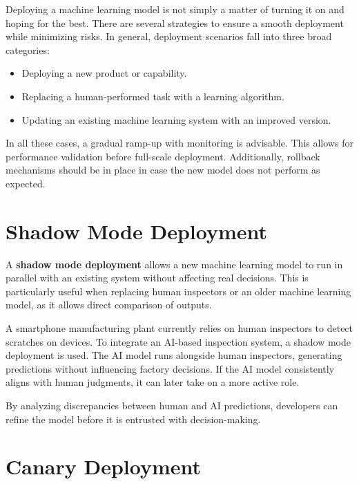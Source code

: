 \documentclass[12pt,openany]{book}
\begin{document}
Deploying a machine learning model is not simply a matter of turning it on and hoping for the best. There are several strategies to ensure a smooth deployment while minimizing risks. In general, deployment scenarios fall into three broad categories:

\begin{itemize}
    \item Deploying a new product or capability.
    \item Replacing a human-performed task with a learning algorithm.
    \item Updating an existing machine learning system with an improved version.
\end{itemize}

In all these cases, a gradual ramp-up with monitoring is advisable. This allows for performance validation before full-scale deployment. Additionally, rollback mechanisms should be in place in case the new model does not perform as expected.



\section{Shadow Mode Deployment}

A \textbf{shadow mode deployment} allows a new machine learning model to run in parallel with an existing system without affecting real decisions. This is particularly useful when replacing human inspectors or an older machine learning model, as it allows direct comparison of outputs.

\begin{examplebox}
   A smartphone manufacturing plant currently relies on human inspectors to detect scratches on devices. To integrate an AI-based inspection system, a shadow mode deployment is used. The AI model runs alongside human inspectors, generating predictions without influencing factory decisions. If the AI model consistently aligns with human judgments, it can later take on a more active role.
\end{examplebox}

By analyzing discrepancies between human and AI predictions, developers can refine the model before it is entrusted with decision-making.



\section{Canary Deployment}
\end{document}
